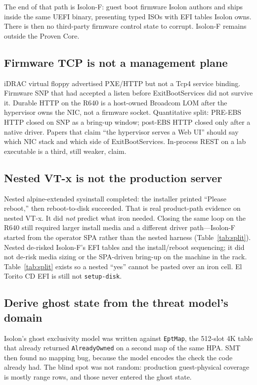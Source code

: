 \documentclass[sigplan,10pt,anonymous]{acmart}
\begin{document}
The end of that path is Isolon-F: guest boot firmware Isolon authors and
ships inside the same UEFI binary, presenting typed ISOs with EFI tables
Isolon owns. There is then no third-party firmware control state to
corrupt. Isolon-F remains outside the Proven Core.

\subsection{Firmware TCP is not a management plane}

iDRAC virtual floppy advertised PXE/HTTP but not a Tcp4 service binding.
Firmware SNP that had accepted a listen before ExitBootServices did not
survive it. Durable HTTP on the R640 is a host-owned Broadcom LOM after
the hypervisor owns the NIC, not a firmware socket. Quantitative split:
PRE-EBS HTTP closed on SNP as a bring-up window; post-EBS HTTP closed
only after a native driver. Papers that claim ``the hypervisor serves a
Web UI'' should say which NIC stack and which side of ExitBootServices.
In-process REST on a lab executable is a third, still weaker, claim.

\subsection{Nested VT-x is not the production server}
\label{sec:nested-not-prod}

Nested alpine-extended sysinstall completed: the installer printed
``Please reboot,'' then reboot-to-disk succeeded. That is real
product-path evidence on nested VT-x. It did \emph{not} predict what
iron needed. Closing the same loop on the R640 still required larger
install media and a different driver path---Isolon-F started from the
operator SPA rather than the nested harness (Table~\ref{tab:split}).
Nested de-risked Isolon-F's EFI tables and the install/reboot sequencing;
it did not de-risk media sizing or the SPA-driven bring-up on the machine
in the rack. Table~\ref{tab:split} exists so a nested ``yes'' cannot be
pasted over an iron cell. El Torito CD EFI is still not
\texttt{setup-disk}.

\subsection{Derive ghost state from the threat model's domain}
\label{sec:model-after}

Isolon's ghost exclusivity model was written against \texttt{EptMap}, the
512-slot 4K table that already returned \texttt{AlreadyOwned} on a second
map of the same HPA. SMT then found no mapping bug, because the model
encodes the check the code already had. The blind spot was not random:
production guest-physical coverage is mostly range rows, and those never
entered the ghost state.
\end{document}
